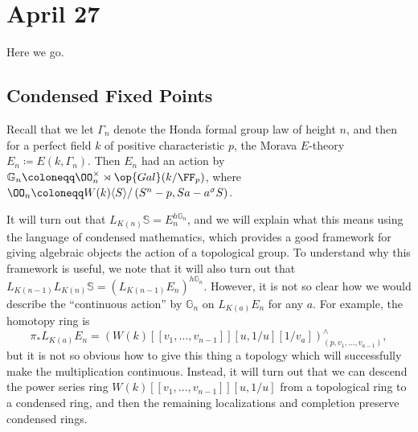 \documentclass[../notes.tex]{subfiles}
\begin{document}
\section{April 27}
Here we go.

\subsection{Condensed Fixed Points}
Recall that we let $\Gamma_n$ denote the Honda formal group law of height $n$, and then for a perfect field $k$ of positive characteristic $p$, the Morava $E$-theory $E_n\coloneqq E(k,\Gamma_n)$. Then $E_n$ had an action by $\mathbb G_n\coloneqq\OO_n^\times\rtimes\op{Gal}(k/\FF_p)$, where $\OO_n\coloneqq W(k)\langle S\rangle/\left(S^n-p,Sa-a^\sigma S\right)$.

It will turn out that $L_{K(n)}\mathbb S=E_n^{h\mathbb G_n}$, and we will explain what this means using the language of condensed mathematics, which provides a good framework for giving algebraic objects the action of a topological group. To understand why this framework is useful, we note that it will also turn out that $L_{K(n-1)}L_{K(n)}\mathbb S=(L_{K(n-1)}E_n)^{h\mathbb G_n}$. However, it is not so clear how we would describe the ``continuous action'' by $\mathbb G_n$ on $L_{K(a)}E_n$ for any $a$. For example, the homotopy ring is
\[\pi_*L_{K(a)}E_n=\left(W(k)[[v_1,\ldots,v_{n-1}]][u,1/u][1/v_a]\right)^\land_{(p,v_1,\ldots,v_{a-1})},\]
but it is not so obvious how to give this thing a topology which will successfully make the multiplication continuous. Instead, it will turn out that we can descend the power series ring $W(k)[[v_1,\ldots,v_{n-1}]][u,1/u]$ from a topological ring to a condensed ring, and then the remaining localizations and completion preserve condensed rings.
\end{document}
